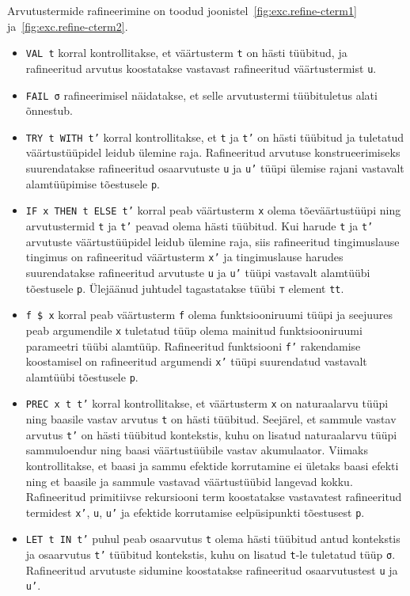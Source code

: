 \documentclass[a4paper,12pt]{article}
\begin{document}
Arvutustermide rafineerimine on toodud joonistel~\ref{fig:exc.refine-cterm1} ja~\ref{fig:exc.refine-cterm2}.
\begin{itemize}
\item {\tt VAL t} korral kontrollitakse, et väärtusterm {\tt t} on hästi tüübitud, ja rafineeritud arvutus koostatakse vastavast rafineeritud väärtustermist {\tt u}.
\item {\tt FAIL σ} rafineerimisel näidatakse, et selle arvutustermi tüübituletus alati õnnestub.
\item {\tt TRY t WITH t'} korral kontrollitakse, et {\tt t} ja {\tt t'} on hästi tüübitud ja tuletatud väärtustüüpidel leidub ülemine raja. Rafineeritud arvutuse konstrueerimiseks suurendatakse rafineeritud osaarvutuste {\tt u} ja {\tt u'} tüüpi ülemise rajani vastavalt alamtüüpimise tõestusele {\tt p}.
\item {\tt IF x THEN t ELSE t'} korral peab väärtusterm {\tt x} olema tõeväärtustüüpi ning arvutustermid {\tt t} ja {\tt t'} peavad olema hästi tüübitud. Kui harude {\tt t} ja {\tt t'} arvutuste väärtustüüpidel leidub ülemine raja, siis rafineeritud tingimuslause tingimus on rafineeritud väärtusterm {\tt x'} ja tingimuslause harudes suurendatakse rafineeritud arvutuste {\tt u} ja {\tt u'} tüüpi vastavalt alamtüübi tõestusele {\tt p}. Ülejäänud juhtudel tagastatakse tüübi {\tt ⊤} element {\tt tt}.
\item {\tt f \$ x} korral peab väärtusterm {\tt f} olema funktsiooniruumi tüüpi ja seejuures peab argumendile {\tt x} tuletatud tüüp olema mainitud funktsiooniruumi parameetri tüübi alamtüüp. Rafineeritud funktsiooni {\tt f'} rakendamise koostamisel on rafineeritud argumendi {\tt x'} tüüpi suurendatud vastavalt alamtüübi tõestusele {\tt p}.
\item {\tt PREC x t t'} korral kontrollitakse, et väärtusterm {\tt x} on naturaalarvu tüüpi ning baasile vastav arvutus {\tt t} on hästi tüübitud. Seejärel, et sammule vastav arvutus {\tt t'} on hästi tüübitud kontekstis, kuhu on lisatud naturaalarvu tüüpi sammuloendur ning baasi väärtustüübile vastav akumulaator. Viimaks kontrollitakse, et baasi ja sammu efektide korrutamine ei ületaks baasi efekti ning et baasile ja sammule vastavad väärtustüübid langevad kokku. Rafineeritud primitiivse rekursiooni term koostatakse vastavatest rafineeritud termidest {\tt x'}, {\tt u}, {\tt u'} ja efektide korrutamise eelpüsipunkti tõestusest {\tt p}.
\item {\tt LET t IN t'} puhul peab osaarvutus {\tt t} olema hästi tüübitud antud kontekstis ja osaarvutus {\tt t'} tüübitud kontekstis, kuhu on lisatud {\tt t}-le tuletatud tüüp {\tt σ}. Rafineeritud arvutuste sidumine koostatakse rafineeritud osaarvutustest {\tt u} ja {\tt u'}.
\end{itemize}
\end{document}
